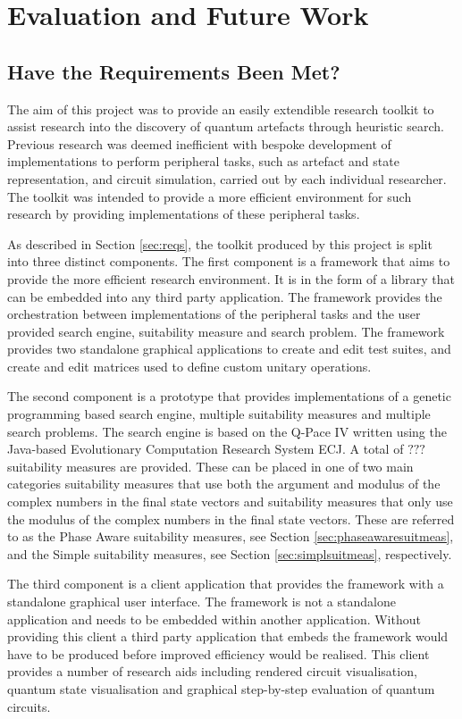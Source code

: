 \chapter{Evaluation and Future Work}

\section{Have the Requirements Been Met?}

The aim of this project was to provide an easily extendible research toolkit to assist research into the discovery of quantum artefacts through heuristic search.
Previous research was deemed inefficient with bespoke development of implementations to perform peripheral tasks, such as artefact and state representation, and circuit simulation, carried out by each individual researcher.
The toolkit was intended to provide a more efficient environment for such research by providing implementations of these peripheral tasks.

As described in Section \ref{sec:reqs}, the toolkit produced by this project is split into three distinct components.
The first component is a framework that aims to provide the more efficient research environment.
It is in the form of a library that can be embedded into any third party application.
The framework provides the orchestration between implementations of the peripheral tasks and the user provided search engine, suitability measure and search problem.
The framework provides two standalone graphical applications to create and edit test suites, and create and edit matrices used to define custom unitary operations.

The second component is a prototype that provides implementations of a genetic programming based search engine, multiple suitability measures and multiple search problems.
The search engine is based on the Q-Pace IV\cite{masseythesis} written using the Java-based Evolutionary Computation Research System ECJ\cite{ecjtool}.
A total of $???$ suitability measures are provided.
These can be placed in one of two main categories suitability measures that use both the argument and modulus of the complex numbers in the final state vectors and suitability measures that only use the modulus of the complex numbers in the final state vectors.
These are referred to as the Phase Aware suitability measures, see Section \ref{sec:phaseawaresuitmeas}, and the Simple suitability measures, see Section \ref{sec:simplsuitmeas}, respectively.

The third component is a client application that provides the framework with a standalone graphical user interface.
The framework is not a standalone application and needs to be embedded within another application.
Without providing this client a third party application that embeds the framework would have to be produced before improved efficiency would be realised.
This client provides a number of research aids including rendered circuit visualisation, quantum state visualisation and graphical step-by-step evaluation of quantum circuits.

